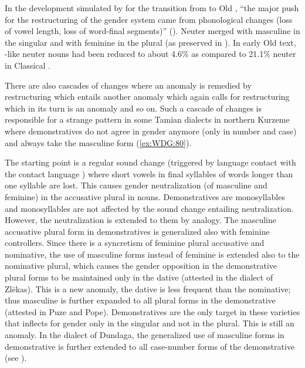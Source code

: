 \documentclass[output=collectionpaper]{langsci/langscibook}
\begin{document}
In the development simulated by \cite{Polinsky2003} for the transition from  to Old , ``the major push for the restructuring of the gender system came from phonological changes (loss of vowel length, loss of word-final segments)'' (\citealt[385]{Polinsky2003}). Neuter merged with masculine in the singular and with feminine in the plural (as preserved in ). In early Old  text, -like neuter nouns had been reduced to about 4.6\% as compared to 21.1\% neuter in Classical .

There are also cascades of changes where an anomaly is remedied by restructuring which entails another anomaly which again calls for restructuring which in its turn is an anomaly and so on. Such a cascade of changes is responsible for a strange pattern in some Tamian  dialects in northern Kurzeme where demonstratives do not agree in gender anymore (only in number and case) and always take the masculine form (\ref{ex:WDG:80}).


The starting point is a regular sound change (triggered by language contact with the  contact language ) where short vowels in final syllables of words longer than one syllable are lost. This causes gender neutralization (of masculine and feminine) in the accusative plural in nouns. Demonstratives are monosyllables and monosyllables are not affected by the sound change entailing neutralization. However, the neutralization is extended to them by analogy. The masculine accusative plural form in demonstratives is generalized also with feminine controllers. Since there is a syncretism of feminine plural accusative and nominative, the use of masculine forms instead of feminine is extended also to the nominative plural, which causes the gender opposition in the demonstrative plural forms to be maintained only in the dative (attested in the dialect of Zlēkas). This is a new anomaly, the dative is less frequent than the nominative; thus masculine is further expanded to all plural forms in the demonstrative (attested in Puze and Pope). Demonstratives are the only target in these varieties that inflects for gender only in the singular and not in the plural. This is still an anomaly. In the dialect of Dundaga, the generalized use of masculine forms in demonstrative is further extended to all case-number forms of the demonstrative (see \citealt{Waelchli2017}).
\end{document}
